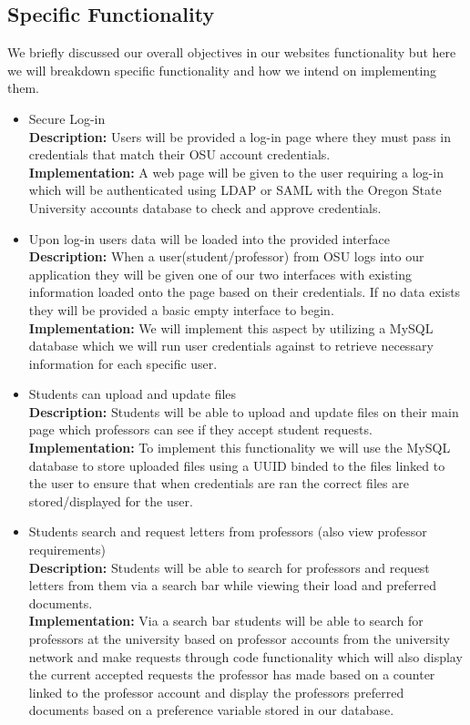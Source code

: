 \documentclass[onecolumn, draftclsnofoot,10pt, compsoc]{IEEEtran}
\begin{document}
\subsection{Specific Functionality}
We briefly discussed our overall objectives in our websites functionality but here we will breakdown specific functionality and how we intend on implementing them. 
   \begin{itemize}
		\item Secure Log-in\\
		\textbf{Description:} Users will be provided a log-in page where they must pass in credentials that match their OSU account credentials.\\
		\textbf{Implementation:} A web page will be given to the user requiring a log-in which will be authenticated using LDAP or SAML with the Oregon State University accounts database to check and approve credentials.\\   		
   		
		\item Upon log-in users data will be loaded into the provided interface\\
		\textbf{Description:} When a user(student/professor) from OSU logs into our application they will be given one of our two interfaces with existing information loaded onto the page based on their credentials. If no data exists they will be provided a basic empty interface to begin.\\
		\textbf{Implementation:} We will implement this aspect by utilizing a MySQL database which we will run user credentials against to retrieve necessary information for each specific user.\\ 
		
		\item Students can upload and update files\\
		\textbf{Description:} Students will be able to upload and update files on their main page which professors can see if they accept student requests.\\
		\textbf{Implementation:} To implement this functionality we will use the MySQL database to store uploaded files using a UUID binded to the files linked to the user to ensure that when credentials are ran the correct files are stored/displayed for the user.\\ 

		\item Students search and request letters from professors (also view professor requirements)\\
		\textbf{Description:} Students will be able to search for professors and request letters from them via a search bar while viewing their load and preferred documents.\\
		\textbf{Implementation:} Via a search bar students will be able to search for professors at the university based on professor accounts from the university network and make requests through code functionality which will also display the current accepted requests the professor has made based on a counter linked to the professor account and display the professors preferred documents based on a preference variable stored in our database.\\ 
		

\end{itemize}
\end{document}
